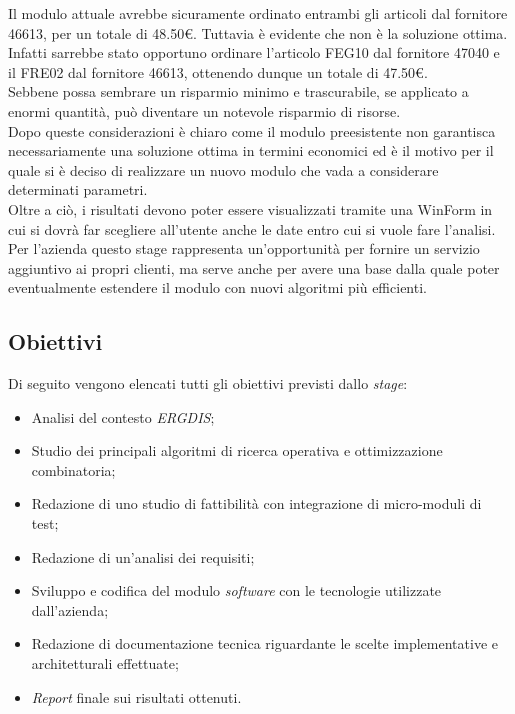 \noindent Il modulo attuale avrebbe sicuramente ordinato entrambi gli articoli dal fornitore 46613,
per un totale di 48.50€. Tuttavia è evidente che non è la soluzione ottima.
Infatti sarrebbe stato opportuno ordinare l'articolo FEG10 dal fornitore 47040 e il
FRE02 dal fornitore 46613, ottenendo dunque un totale di 47.50€.\\
Sebbene possa sembrare un risparmio minimo e trascurabile, se applicato a enormi quantità, può
diventare un notevole risparmio di risorse.\\

\noindent Dopo queste considerazioni è chiaro come il modulo preesistente non garantisca necessariamente una soluzione ottima in termini economici ed è il motivo per il quale
si è deciso di realizzare un nuovo modulo che vada a considerare determinati parametri.\\

\noindent Oltre a ciò, i risultati devono poter essere visualizzati tramite una WinForm in cui si dovrà far scegliere all'utente
anche le date entro cui si vuole fare l'analisi.\\

\noindent Per l'azienda questo stage rappresenta un'opportunità per fornire un servizio aggiuntivo ai propri clienti, ma serve anche per avere una base
dalla quale poter eventualmente estendere il modulo con nuovi algoritmi più efficienti.
\newpage
\subsection{Obiettivi}

\noindent Di seguito vengono elencati tutti gli obiettivi previsti dallo \textit{stage}:
\begin{itemize}
    \item Analisi del contesto \textit{ERGDIS};
    \item Studio dei principali algoritmi di ricerca operativa e ottimizzazione combinatoria;
    \item Redazione di uno studio di fattibilità con integrazione di micro-moduli di test;
    \item Redazione di un'analisi dei requisiti;
    \item Sviluppo e codifica del modulo \textit{software} con le tecnologie utilizzate dall'azienda;
    \item Redazione di documentazione tecnica riguardante le scelte implementative e architetturali effettuate;
    \item \textit{Report} finale sui risultati ottenuti.
\end{itemize}
